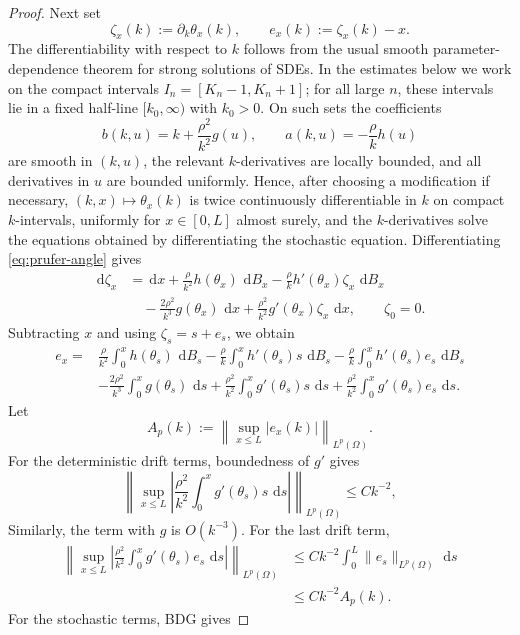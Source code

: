 \documentclass[10pt,a4paper]{amsart}
\newcommand{\dd}{\,\mathrm d}
\begin{document}
\begin{proof}
Next set
\[
    \zeta_x(k):=\partial_k\theta_x(k),\qquad e_x(k):=\zeta_x(k)-x .
\]
The differentiability with respect to $k$ follows from the usual smooth parameter-dependence theorem for strong solutions of SDEs. In the estimates below we work on the compact intervals $I_n=[K_n-1,K_n+1]$; for all large $n$, these intervals lie in a fixed half-line $[k_0,\infty)$ with $k_0>0$. On such sets the coefficients
\[
    b(k,u)=k+\frac{\rho^2}{k^2}g(u),
    \qquad
    a(k,u)=-\frac{\rho}{k}h(u)
\]
are smooth in $(k,u)$, the relevant $k$-derivatives are locally bounded, and all derivatives in $u$ are bounded uniformly. Hence, after choosing a modification if necessary, $(k,x)\mapsto\theta_x(k)$ is twice continuously differentiable in $k$ on compact $k$-intervals, uniformly for $x\in[0,L]$ almost surely, and the $k$-derivatives solve the equations obtained by differentiating the stochastic equation. Differentiating \eqref{eq:prufer-angle} gives
\[
\begin{aligned}
    \dd\zeta_x
    &=\dd x+\frac{\rho}{k^2}h(\theta_x)\,\dd B_x
      -\frac{\rho}{k}h'(\theta_x)\zeta_x\,\dd B_x \\
    &\quad -\frac{2\rho^2}{k^3}g(\theta_x)\,\dd x
      +\frac{\rho^2}{k^2}g'(\theta_x)\zeta_x\,\dd x,
    \qquad \zeta_0=0.
\end{aligned}
\]
Subtracting $x$ and using $\zeta_s=s+e_s$, we obtain
\[
\begin{aligned}
    e_x
    ={}&\frac{\rho}{k^2}\int_0^x h(\theta_s)\,\dd B_s
      -\frac{\rho}{k}\int_0^x h'(\theta_s)s\,\dd B_s
      -\frac{\rho}{k}\int_0^x h'(\theta_s)e_s\,\dd B_s \\
    &-\frac{2\rho^2}{k^3}\int_0^x g(\theta_s)\,\dd s
      +\frac{\rho^2}{k^2}\int_0^x g'(\theta_s)s\,\dd s
      +\frac{\rho^2}{k^2}\int_0^x g'(\theta_s)e_s\,\dd s .
\end{aligned}
\]
Let
\[
    A_p(k):=\left\|\sup_{x\le L}|e_x(k)|\right\|_{L^p(\Omega)} .
\]
For the deterministic drift terms, boundedness of $g'$ gives
\[
    \left\|\sup_{x\le L}\left|\frac{\rho^2}{k^2}\int_0^x g'(\theta_s)s\,\dd s\right|\right\|_{L^p(\Omega)}
    \le Ck^{-2},
\]
Similarly, the term with $g$ is $O(k^{-3})$. For the last drift term,
\[
\begin{aligned}
    \left\|\sup_{x\le L}\left|\frac{\rho^2}{k^2}\int_0^x g'(\theta_s)e_s\,\dd s\right|\right\|_{L^p(\Omega)}
    &\le Ck^{-2}\int_0^L \|e_s\|_{L^p(\Omega)}\,\dd s  \\
    &\le Ck^{-2}A_p(k).
\end{aligned}
\]
For the stochastic terms, BDG gives

\end{proof}
\end{document}
